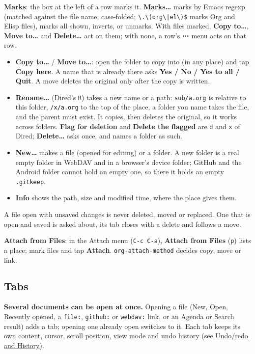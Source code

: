 \documentclass[11pt]{article}
\begin{document}
\textbf{Marks}: the box at the left of a row marks it. \textbf{Marks…} marks by Emacs regexp (matched against the file name, case-folded; \texttt{\textbackslash{}.\textbackslash{}(org\textbackslash{}|el\textbackslash{})\$} marks Org and Elisp files), marks all shown, inverts, or unmarks. With files marked, \textbf{Copy to…}, \textbf{Move to…} and \textbf{Delete…} act on them; with none, a row's \textbf{⋯} menu acts on that row.

\begin{itemize}
\item \textbf{Copy to…} / \textbf{Move to…}: open the folder to copy into (in any place) and tap \textbf{Copy here}. A name that is already there asks \textbf{Yes / No / Yes to all / Quit}. A move deletes the original only after the copy is written.
\item \textbf{Rename…} (Dired's \texttt{R}) takes a new name or a path: \texttt{sub/a.org} is relative to this folder, \texttt{/x/a.org} to the top of the place, a folder you name takes the file, and the parent must exist. It copies, then deletes the original, so it works across folders. \textbf{Flag for deletion} and \textbf{Delete the flagged} are \texttt{d} and \texttt{x} of Dired; \textbf{Delete…} asks once, and names a folder as such.
\item \textbf{New…} makes a file (opened for editing) or a folder. A new folder is a real empty folder in WebDAV and in a browser's device folder; GitHub and the Android folder cannot hold an empty one, so there it holds an empty \texttt{.gitkeep}.
\item \textbf{Info} shows the path, size and modified time, where the place gives them.
\end{itemize}

A file open with unsaved changes is never deleted, moved or replaced. One that is open and saved is asked about, its tab closes with a delete and follows a move.

\textbf{Attach from Files}: in the Attach menu (\texttt{C-c C-a}), \textbf{Attach from Files} (\texttt{p}) lists a place; mark files and tap \textbf{Attach}. \texttt{org-attach-method} decides copy, move or link.

\subsection{Tabs}
\label{sec:orgb1922d6}
\textbf{Several documents can be open at once.} Opening a file (New, Open, Recently opened, a \texttt{file:}, \texttt{github:} or \texttt{webdav:} link, or an Agenda or Search result) adds a tab; opening one already open switches to it. Each tab keeps its own content, cursor, scroll position, view mode and undo history (see \hyperref[sec:org82ca105]{Undo/redo and History}).
\end{document}

